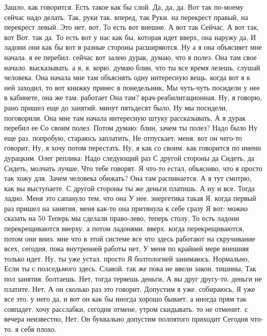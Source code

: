 Зашло, как говорится.
Есть такое как бы слой.
Да, да, да.
Вот так по-моему сейчас надо делать.
Так, руки так.
вперед, так Руки.
на перекрест правый, на перекрест левый. Это нет, вот, То есть вот внешне. А вот так Сейчас.
А вот так, вот Вот.
так да. То есть вот у нас как бы, которая идет вверх, она наружу да, И ладони они как бы вот в разные стороны расширяются.
Ну а я она объясняет мне начала. я ее перебил. сейчас вот залею дурак, думаю, что я полез. Она там свое начало.
высказывать. а я, я.
корю. думаю блин, что ты все время лезешь, слушай человека. Она начала мне там объяснять одну интересную вещь. когда вот я к ней заходил, то вот книжку принес в понедельник, Мы чуть-чуть посидели у нее в кабинете, она же там.
работает Она там?
врач-реабилитационная. Ну, я говорю, рано пришел еще до занятий.
минут пятьдесят было, Ну мы
посидели, поговорили. Она мне там начала интересную штуку рассказывать, А я дурак перебил ее Со своим полез. Потом думаю: блин, зачем ты полез? Надо было Ну еще раз.
попробую, стараюсь заплатить, Не отпускает.
меня. вот он чего-то говорит, Ну, я хочу потом перестать. Ну, я как со своим.
как говорится по имени дурацким.
Олег реплика: Надо следующий раз С другой стороны да Сидеть, да Сидеть, молчать лучше, Что тебе говорят. Я что-то естал, объясняю, что я просто так хожу для.
Зачем человека обижать? Она там распинается.
А я тут смотрю, как вы выступаете. С другой стороны ты же деньги платишь. А ну и все. Тогда ладно. Меня это сапануло тем, что она У нее.
энергетика такая Я. когда первый раз пришел на занятия, меня как-то она притянула к себе сразу Я вот:
можно сказать на 50%
Теперь мы сделали право-лево, теперь столу, То есть ладони перекрещиваются вверху.
а потом ладонями.
вверх. когда перекрещиваются, потом они вниз.
мне что в этой системе все что здесь работают на скручивание всех,
сегодня, пока внутренней работы нет, У меня по крайней мере внешняя только идет. Ну, ты уже устал. просто Я болтологией занимаюсь. Нормально, Если
ты с полседьмого здесь.
Славой. так же пока не ввели закон.
тишины, Так пол занятия.
болтаешь. Нет, тогда теряешь деньги, А вы друг другу-то.
деньги не платите.
Нет, А он сколько раз это говорит. Допустим я уже.
собираюсь, Я уже все это.
у него да, и вот он как бы иногда хорошо бывает, а иногда прям так совпадет. хочу расслабки, сегодня отмене, утром скидывать.
то не отменит. с вечера неизвестно, Нет, Он буквально допустим полпятого приходит Сегодня что-то.
я себя плохо.
